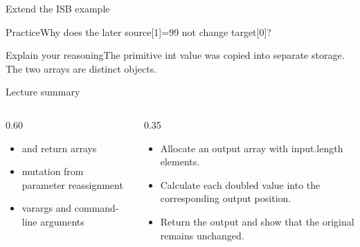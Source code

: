 \documentclass[10pt,aspectratio=169]{beamer}
\begin{document}
\begin{frame}[fragile,t]{Extend the ISB example}
\begin{alertblock}{Practice}Why does the later source[1]=99 not change target[0]?\end{alertblock}\vspace{3mm}\begin{exampleblock}{Explain your reasoning}The primitive int value was copied into separate storage. The two arrays are distinct objects.\end{exampleblock}
\end{frame}
\begin{frame}[fragile,t]{Lecture summary}
\begin{columns}[T,onlytextwidth]\begin{column}{0.60\textwidth}
\begin{itemize}
\item and return arrays
\item mutation from parameter reassignment
\item varargs and command-line arguments
\end{itemize}
\end{column}\begin{column}{0.35\textwidth}\small
\begin{itemize}
\item Allocate an output array with input.length elements.
\item Calculate each doubled value into the corresponding output position.
\item Return the output and show that the original remains unchanged.
\end{itemize}
\end{column}\end{columns}
\end{frame}
\end{document}
